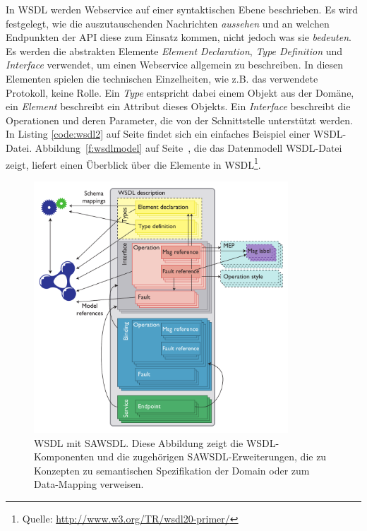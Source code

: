 In \ac{WSDL} werden Webservice auf einer syntaktischen Ebene beschrieben. Es wird festgelegt, wie die auszutauschenden Nachrichten \emph{aussehen} und an welchen Endpunkten der \ac{API} diese zum Einsatz kommen, nicht jedoch was sie \emph{bedeuten}. Es werden die abstrakten Elemente \emph{Element Declaration}, \emph{Type Definition} und \emph{Interface} verwendet, um einen Webservice allgemein zu beschreiben. In diesen Elementen spielen die technischen Einzelheiten, wie z.B. das verwendete Protokoll, keine Rolle. Ein \emph{Type} entspricht dabei einem Objekt aus der Domäne, ein \emph{Element} beschreibt ein Attribut dieses Objekts. Ein \emph{Interface} beschreibt die Operationen und deren Parameter, die von der Schnittstelle unterstützt werden. In Listing \ref{code:wsdl2} auf Seite \pageref{code:wsdl2} findet sich ein einfaches Beispiel einer \ac{WSDL}-Datei. Abbildung~\ref{f:wsdlmodel} auf Seite~\pageref{f:wsdlmodel}, die das Datenmodell \ac{WSDL}-Datei zeigt, liefert einen Überblick über die Elemente in \ac{WSDL}\footnote{Quelle: \url{http://www.w3.org/TR/wsdl20-primer/}}.

\begin{figure}[ht]
\centering
\parbox{0.85\textwidth}{
    \includegraphics[width=0.85\textwidth]{media/sawsdl.png}
    \caption{\ac{WSDL} mit \ac{SAWSDL}. Diese Abbildung zeigt die \ac{WSDL}-Komponenten und die zugehörigen \ac{SAWSDL}-Erweiterungen, die zu Konzepten zu semantischen Spezifikation der Domain oder zum Data-Mapping verweisen. \cite[S.61]{ky-sawsdl}
}
    \label{f:sawsdl}
}
\end{figure}

